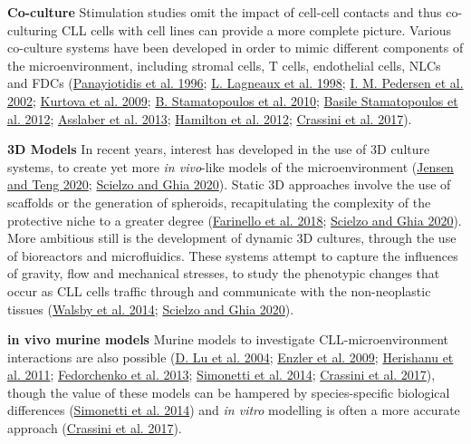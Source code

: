 \documentclass[11pt, a4paper, twosided]{book}
\begin{document}
\textbf{Co-culture}
Stimulation studies omit the impact of cell-cell contacts and thus co-culturing CLL cells with cell lines can provide a more complete picture. Various co-culture systems have been developed in order to mimic different components of the microenvironment, including stromal cells, T cells, endothelial cells, NLCs and FDCs (\protect\hyperlink{ref-Panayiotidis1996}{Panayiotidis et al. 1996}; \protect\hyperlink{ref-Lagneaux1998}{L. Lagneaux et al. 1998}; \protect\hyperlink{ref-Pedersen2002}{I. M. Pedersen et al. 2002}; \protect\hyperlink{ref-Kurtova2009}{Kurtova et al. 2009}; \protect\hyperlink{ref-Stamatopoulos2010}{B. Stamatopoulos et al. 2010}; \protect\hyperlink{ref-Stamatopoulos2012}{Basile Stamatopoulos et al. 2012}; \protect\hyperlink{ref-Asslaber2013}{Asslaber et al. 2013}; \protect\hyperlink{ref-Hamilton2012}{Hamilton et al. 2012}; \protect\hyperlink{ref-Crassini2017}{Crassini et al. 2017}).

\textbf{3D Models}
In recent years, interest has developed in the use of 3D culture systems, to create yet more \emph{in vivo}-like models of the microenvironment (\protect\hyperlink{ref-Jensen2020}{Jensen and Teng 2020}; \protect\hyperlink{ref-Scielzo2020}{Scielzo and Ghia 2020}). Static 3D approaches involve the use of scaffolds or the generation of spheroids, recapitulating the complexity of the protective niche to a greater degree (\protect\hyperlink{ref-Farinello2018}{Farinello et al. 2018}; \protect\hyperlink{ref-Scielzo2020}{Scielzo and Ghia 2020}). More ambitious still is the development of dynamic 3D cultures, through the use of bioreactors and microfluidics. These systems attempt to capture the influences of gravity, flow and mechanical stresses, to study the phenotypic changes that occur as CLL cells traffic through and communicate with the non-neoplastic tissues (\protect\hyperlink{ref-Walsby2014}{Walsby et al. 2014}; \protect\hyperlink{ref-Scielzo2020}{Scielzo and Ghia 2020}).

\textbf{in vivo murine models}
Murine models to investigate CLL-microenvironment interactions are also possible (\protect\hyperlink{ref-Lu2004}{D. Lu et al. 2004}; \protect\hyperlink{ref-Enzler2009}{Enzler et al. 2009}; \protect\hyperlink{ref-Herishanu2011}{Herishanu et al. 2011}; \protect\hyperlink{ref-Fedorchenko2013}{Fedorchenko et al. 2013}; \protect\hyperlink{ref-Simonetti2014}{Simonetti et al. 2014}; \protect\hyperlink{ref-Crassini2017}{Crassini et al. 2017}), though the value of these models can be hampered by species-specific biological differences (\protect\hyperlink{ref-Simonetti2014}{Simonetti et al. 2014}) and \emph{in vitro} modelling is often a more accurate approach (\protect\hyperlink{ref-Crassini2017}{Crassini et al. 2017}).
\end{document}
